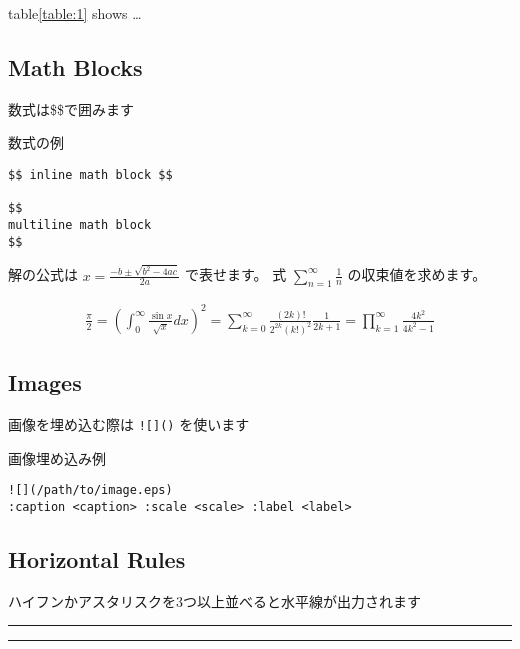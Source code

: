 \documentclass[a4j]{jarticle}
\begin{document}
table\ref{table:1} shows \ldots{}

\subsection{Math Blocks}

数式は\$\$で囲みます

\begin{itembox}[c]{数式の例}
\begin{verbatim}
$$ inline math block $$

$$
multiline math block
$$
\end{verbatim}
\end{itembox}

解の公式は $ x = \frac{-b\pm\sqrt{b^2-4ac}}{2a} $ で表せます。
式 $ \sum_{n = 1}^{\infty} \frac{1}{n} $ の収束値を求めます。

\begin{eqnarray*}
\frac{\pi}{2}
= \left( \int_{0}^{\infty} \frac{\sin x}{\sqrt{x}} dx \right)^2 
= \sum_{k=0}^{\infty} \frac{(2k)!}{2^{2k}(k!)^2} \frac{1}{2k+1} 
= \prod_{k=1}^{\infty} \frac{4k^2}{4k^2 - 1}
\end{eqnarray*}

\subsection{Images}

画像を埋め込む際は {\tt ![]()} を使います

\begin{itembox}[c]{画像埋め込み例}
\begin{verbatim}
![](/path/to/image.eps)
:caption <caption> :scale <scale> :label <label>
\end{verbatim}
\end{itembox}

\subsection{Horizontal Rules}

ハイフンかアスタリスクを3つ以上並べると水平線が出力されます

\begin{center}
\rule{3in}{0.4pt}
\end{center}

\begin{center}
\rule{3in}{0.4pt}
\end{center}
\end{document}
